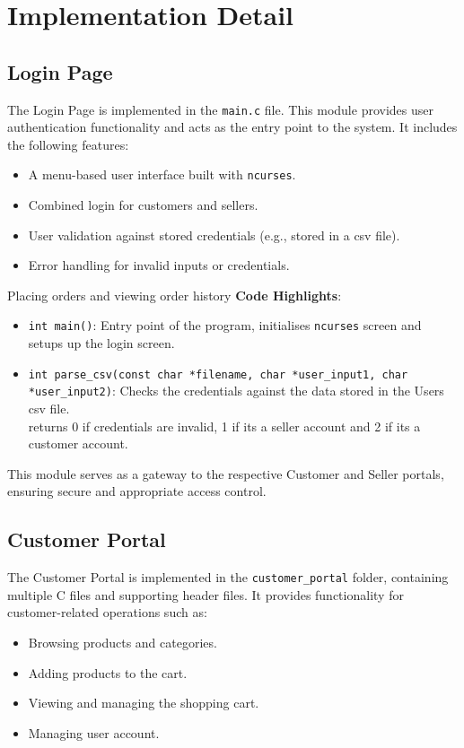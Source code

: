\documentclass[12pt,a4paper]{article}
\begin{document}
\section{Implementation Detail}
\subsection{Login Page}
The Login Page is implemented in the \texttt{main.c} file. This module provides user authentication functionality and acts as the entry point to the system. It includes the following features:
\begin{itemize}
    \item A menu-based user interface built with \texttt{ncurses}.
    \item Combined login for customers and sellers.
    \item User validation against stored credentials (e.g., stored in a csv file).
    \item Error handling for invalid inputs or credentials.
\end{itemize}
Placing orders and viewing order history
\textbf{Code Highlights}:
\begin{itemize}
    \item \texttt{int main()}: Entry point of the program, initialises \texttt{ncurses} screen and setups up the login screen.
    \item \texttt{int parse\_csv(const char *filename, char *user\_input1, char *user\_input2)}: Checks the credentials against the data stored in the Users csv file. \\ returns 0 if credentials are invalid, 1 if its a seller account and 2 if its a customer account.
\end{itemize}

This module serves as a gateway to the respective Customer and Seller portals, ensuring secure and appropriate access control.

\subsection{Customer Portal}
The Customer Portal is implemented in the \texttt{customer\_portal} folder, containing multiple C files and supporting header files. It provides functionality for customer-related operations such as:
\begin{itemize}
    \item Browsing products and categories.
    \item Adding products to the cart.
    \item Viewing and managing the shopping cart.
    \item Managing user account.
\end{itemize}
\end{document}
